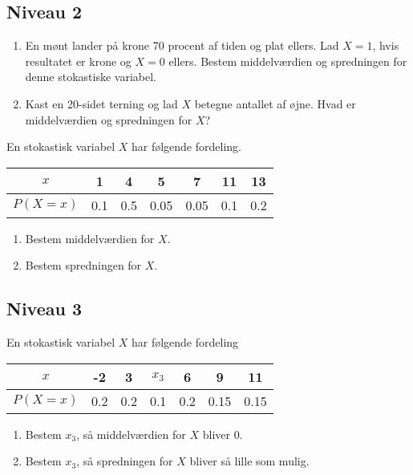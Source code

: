 \documentclass[12pt]{article}
\begin{document}
\subsection*{Niveau 2}

\begin{enumerate}[label=\roman*)]
	\item En mønt lander på krone 70 procent af tiden og plat ellers. Lad $X = 1$, hvis resultatet er krone og $X = 0 $ ellers. Bestem middelværdien og spredningen for denne stokastiske variabel. 
	\item Kast en 20-sidet terning og lad $X$ betegne antallet af øjne. Hvad er middelværdien og spredningen for $X$?
\end{enumerate}

En stokastisk variabel $X$ har følgende fordeling.
\begin{table}[H]
	\centering
	\begin{tabular}{c|c|c|c|c|c|c}
		$x$ & 1 & 4 & 5 & 7 & 11 & 13 \\
		\hline
		$P(X = x)$ & 0.1 & 0.5 & 0.05 & 0.05 & 0.1 & 0.2
	\end{tabular}
\end{table}

\begin{enumerate}[label=\roman*)]
	\item Bestem middelværdien for $X$.
	\item Bestem spredningen for $X$.
\end{enumerate}

\subsection*{Niveau 3}

En stokastisk variabel $X$ har følgende fordeling
\begin{table}[H]
	\centering
	\begin{tabular}{c|c|c|c|c|c|c}
		$x$ & -2 & 3 & $x_3$ & 6 & 9 & 11 \\
		\hline
		$P(X = x)$ & 0.2  & 0.2 & 0.1 & 0.2 & 0.15 & 0.15
	\end{tabular}
\end{table}

\begin{enumerate}[label=\roman*)]
	\item Bestem $x_3$, så middelværdien for $X$ bliver 0.
	\item Bestem $x_3$, så spredningen for $X$ bliver så lille som mulig. 
\end{enumerate}
\end{document}
